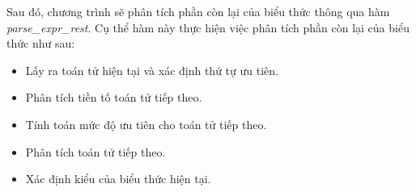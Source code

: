 Sau đó, chương trình sẽ phân tích phần còn lại của biểu thức thông qua hàm \textit{parse\_expr\_rest}. Cụ thể hàm này thực hiện việc phân tích phần còn lại của biểu thức như sau:
\begin{itemize}
    \item Lấy ra toán tử hiện tại và xác định thứ tự ưu tiên.
        

        
    \item Phân tích tiền tố toán tử tiếp theo.

        
    \item Tính toán mức độ ưu tiên cho toán tử tiếp theo.

        
    \item Phân tích toán tử tiếp theo.

        
    \item Xác định kiểu của biểu thức hiện tại.
        

\end{itemize}
